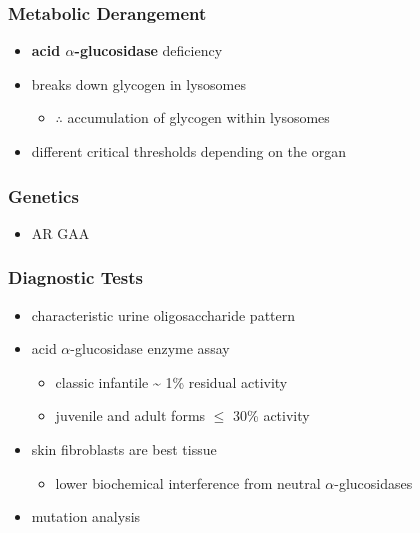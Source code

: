 \documentclass[12pt]{scrartcl}
\begin{document}
\subsubsection{Metabolic Derangement}
\label{sec:org0046226}
\begin{itemize}
\item \textbf{acid \(\alpha\)-glucosidase} deficiency
\item breaks down glycogen in lysosomes
\begin{itemize}
\item \(\therefore\) accumulation of glycogen within lysosomes
\end{itemize}
\item different critical thresholds depending on the organ
\end{itemize}
\subsubsection{Genetics}
\label{sec:orge4d3335}
\begin{itemize}
\item AR GAA
\end{itemize}

\subsubsection{Diagnostic Tests}
\label{sec:org139c100}
\begin{itemize}
\item characteristic urine oligosaccharide pattern
\item acid \(\alpha\)-glucosidase enzyme assay
\begin{itemize}
\item classic infantile \textasciitilde{} 1\% residual activity
\item juvenile and adult forms \(\le\) 30\% activity
\end{itemize}
\item skin fibroblasts are best tissue
\begin{itemize}
\item lower biochemical interference from neutral \(\alpha\)-glucosidases
\end{itemize}
\item mutation analysis
\end{itemize}
\end{document}
